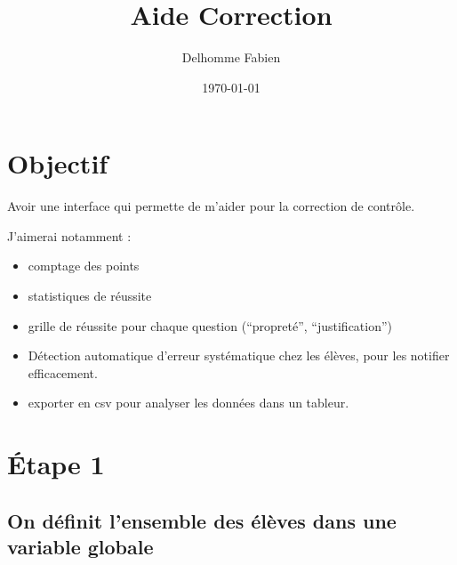 \documentclass[a4paper, 11pt, DIV=18]{scrartcl}
\author{Delhomme Fabien}
\date{\today}
\title{Aide Correction}
\begin{document}
\maketitle

\section{Objectif}
\label{sec:org9ad739c}

Avoir une interface qui permette de m'aider pour la correction de contrôle.

J'aimerai notamment :

\begin{itemize}
\item comptage des points
\item statistiques de réussite
\item grille de réussite pour chaque question (``propreté'', ``justification'')
\item Détection automatique d'erreur systématique chez les élèves, pour les notifier
efficacement.
\item exporter en csv pour analyser les données dans un tableur.
\end{itemize}

\section{Étape 1}
\label{sec:orgd8aa5c1}

\subsection{On définit l'ensemble des élèves dans une variable globale}
\label{sec:org8b602dc}
\end{document}
